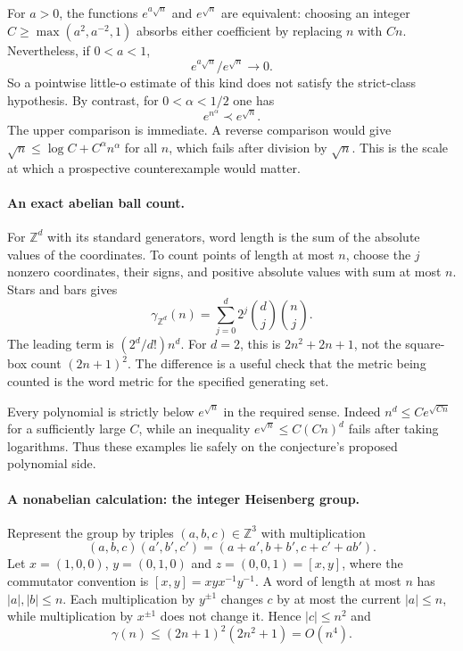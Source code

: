 \documentclass[11pt]{article}
\begin{document}
For $a>0$, the functions $e^{a\sqrt n}$ and $e^{\sqrt n}$ are equivalent: choosing an integer $C\ge\max(a^2,a^{-2},1)$ absorbs either coefficient by replacing $n$ with $Cn$. Nevertheless, if $0<a<1$,
\[
 e^{a\sqrt n}/e^{\sqrt n}\longrightarrow0.
\]
So a pointwise little-o estimate of this kind does not satisfy the strict-class hypothesis. By contrast, for $0<\alpha<1/2$ one has
\[
 e^{n^\alpha}\prec e^{\sqrt n}.
\]
The upper comparison is immediate. A reverse comparison would give $\sqrt n\le\log C+C^\alpha n^\alpha$ for all $n$, which fails after division by $\sqrt n$. This is the scale at which a prospective counterexample would matter.

\paragraph{An exact abelian ball count.}
For $\mathbb Z^d$ with its standard generators, word length is the sum of the absolute values of the coordinates. To count points of length at most $n$, choose the $j$ nonzero coordinates, their signs, and positive absolute values with sum at most $n$. Stars and bars gives
\[
 \gamma_{\mathbb Z^d}(n)
 =\sum_{j=0}^d 2^j\binom dj\binom nj.                       \tag{1}
\]
The leading term is $(2^d/d!)n^d$. For $d=2$, this is $2n^2+2n+1$, not the square-box count $(2n+1)^2$. The difference is a useful check that the metric being counted is the word metric for the specified generating set.

Every polynomial is strictly below $e^{\sqrt n}$ in the required sense. Indeed $n^d\le C e^{\sqrt{Cn}}$ for a sufficiently large $C$, while an inequality $e^{\sqrt n}\le C(Cn)^d$ fails after taking logarithms. Thus these examples lie safely on the conjecture's proposed polynomial side.

\paragraph{A nonabelian calculation: the integer Heisenberg group.}
Represent the group by triples $(a,b,c)\in\mathbb Z^3$ with multiplication
\[
 (a,b,c)(a',b',c')=(a+a',b+b',c+c'+ab').                    \tag{2}
\]
Let $x=(1,0,0)$, $y=(0,1,0)$ and $z=(0,0,1)=[x,y]$, where the commutator convention is $[x,y]=xyx^{-1}y^{-1}$. A word of length at most $n$ has $|a|,|b|\le n$. Each multiplication by $y^{\pm1}$ changes $c$ by at most the current $|a|\le n$, while multiplication by $x^{\pm1}$ does not change it. Hence $|c|\le n^2$ and
\[
 \gamma(n)\le(2n+1)^2(2n^2+1)=O(n^4).                    \tag{3}
\]
\end{document}
